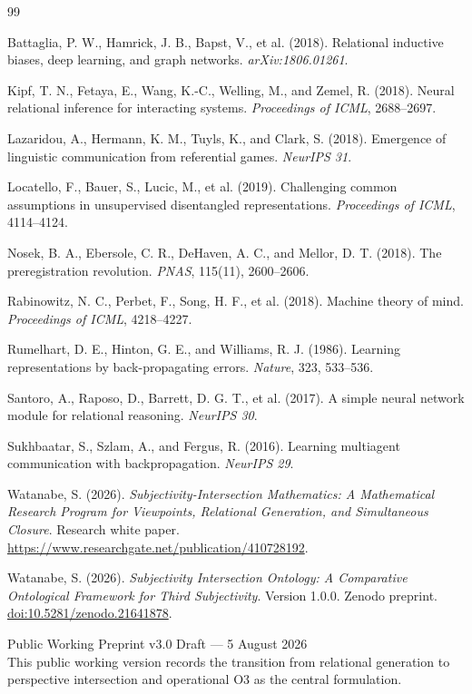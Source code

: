 \documentclass[11pt,a4paper]{article}
\begin{document}
\renewcommand{\refname}{Selected references}
\begin{thebibliography}{99}

Battaglia, P. W., Hamrick, J. B., Bapst, V., et al. (2018). Relational inductive biases, deep learning, and graph networks. \emph{arXiv:1806.01261}.

Kipf, T. N., Fetaya, E., Wang, K.-C., Welling, M., and Zemel, R. (2018). Neural relational inference for interacting systems. \emph{Proceedings of ICML}, 2688--2697.

Lazaridou, A., Hermann, K. M., Tuyls, K., and Clark, S. (2018). Emergence of linguistic communication from referential games. \emph{NeurIPS 31}.

Locatello, F., Bauer, S., Lucic, M., et al. (2019). Challenging common assumptions in unsupervised disentangled representations. \emph{Proceedings of ICML}, 4114--4124.

Nosek, B. A., Ebersole, C. R., DeHaven, A. C., and Mellor, D. T. (2018). The preregistration revolution. \emph{PNAS}, 115(11), 2600--2606.

Rabinowitz, N. C., Perbet, F., Song, H. F., et al. (2018). Machine theory of mind. \emph{Proceedings of ICML}, 4218--4227.

Rumelhart, D. E., Hinton, G. E., and Williams, R. J. (1986). Learning representations by back-propagating errors. \emph{Nature}, 323, 533--536.

Santoro, A., Raposo, D., Barrett, D. G. T., et al. (2017). A simple neural network module for relational reasoning. \emph{NeurIPS 30}.

Sukhbaatar, S., Szlam, A., and Fergus, R. (2016). Learning multiagent communication with backpropagation. \emph{NeurIPS 29}.

Watanabe, S. (2026). \emph{Subjectivity-Intersection Mathematics: A Mathematical Research Program for Viewpoints, Relational Generation, and Simultaneous Closure}. Research white paper. \url{https://www.researchgate.net/publication/410728192}.

Watanabe, S. (2026). \emph{Subjectivity Intersection Ontology: A Comparative Ontological Framework for Third Subjectivity}. Version 1.0.0. Zenodo preprint. \href{https://doi.org/10.5281/zenodo.21641878}{doi:10.5281/zenodo.21641878}.

\end{thebibliography}

\vfill
\begin{center}
\small\sffamily
Public Working Preprint v3.0 Draft --- 5 August 2026\\
This public working version records the transition from relational generation to perspective intersection and operational O3 as the central formulation.
\end{center}
\end{document}
